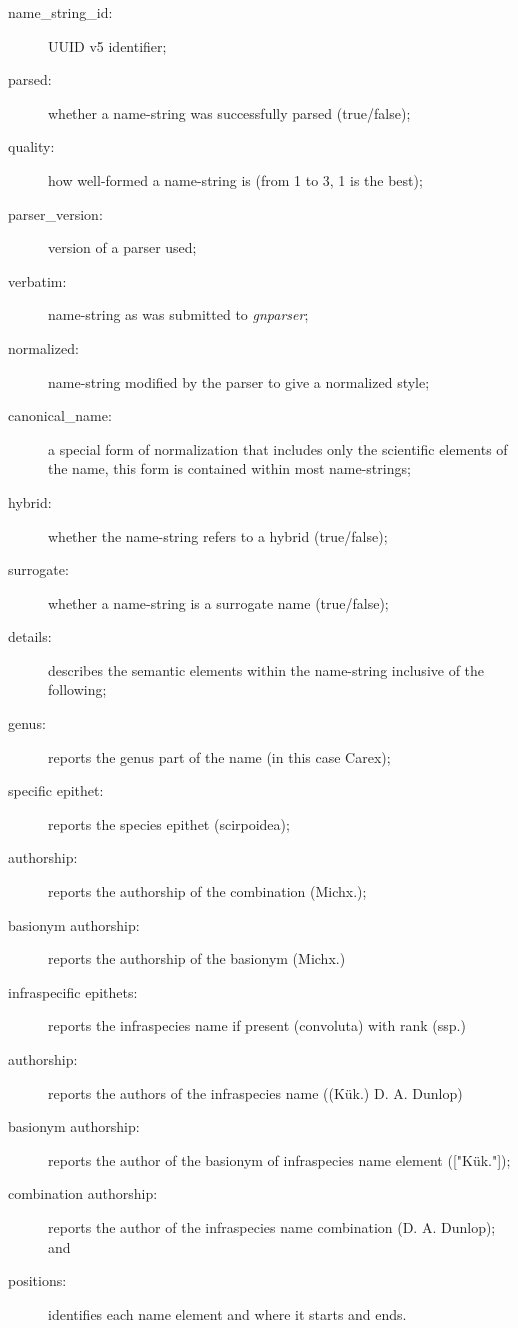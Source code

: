 \documentclass{bmcart}
\begin{document}
\begin{description}

  \item[name\_string\_id:] UUID v5 identifier;
  \item[parsed:] whether a name-string was successfully parsed (true/false);
  \item[quality:] how well-formed a name-string is (from 1 to 3, 1 is the     best);
  \item[parser\_version:] version of a parser used;
  \item[verbatim:] name-string as was submitted to \textit{gnparser};
  \item[normalized:] name-string modified by the parser to give a normalized style;
  \item[canonical\_name:] a special form of normalization that includes only the scientific elements of the name, this form is contained within most name-strings;
  \item[hybrid:] whether the name-string refers to a hybrid (true/false);
  \item[surrogate:] whether a name-string is a surrogate name (true/false);
  \item[details:] describes the semantic elements within the name-string inclusive of the following;
  \item[genus:] reports the genus part of the name (in this case Carex);
  \item[specific epithet:] reports the species epithet (scirpoidea);  \item[authorship:] reports the authorship of the combination (Michx.);
  \item[basionym authorship:] reports the authorship of the basionym (Michx.)
  \item[infraspecific epithets:] reports the infraspecies name if present (convoluta) with rank (ssp.)
  \item[authorship:] reports the authors of the infraspecies name ((Kük.) D. A. Dunlop)
  \item[basionym authorship:] reports the author of the basionym of infraspecies name element (["Kük."]);
  \item[combination authorship:] reports the author of the infraspecies name combination (D. A. Dunlop); and
  \item[positions:] identifies each name element and where it starts and ends.
\end{description}
\end{document}
